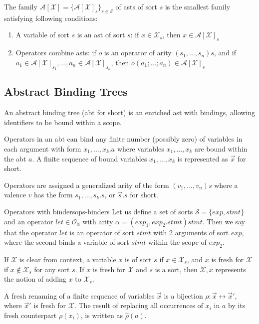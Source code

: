 The family $\mathcal{A}[\mathcal{X}] = \{ \mathcal{A}[\mathcal{X}]_s \}_{s \in \mathcal{S}}$ of asts of sort $s$ is the smallest family satisfying following conditions:

\begin{enumerate}
    \item A variable of sort $s$ is an ast of sort $s$: if $x \in \mathcal{X}_s$, then $x \in \mathcal{A}[ \mathcal{X}]_s$
    \item Operators combine asts: if $o$ is an operator of arity $(s_1,...,s_n)s$, and if $a_1 \in \mathcal{A}[\mathcal{X}]_{s_1},...,a_n \in \mathcal{A}[\mathcal{X}]_{s_n}$, then $o(a_1;...;a_n) \in \mathcal{A}[\mathcal{X}]_s$
\end{enumerate}

\subsection{Abstract Binding Trees}
An abstract binding tree (abt for short) is an enriched ast with bindings, allowing identifiers to be bound within a scope.

Operators in an abt can bind any finite number (possibly zero) of variables in each argument with form $x_1,...,x_k.a$ where variables $x_1,...,x_k$ are bound within the abt $a$. A finite sequence of bound variables $x_1,...,x_k$ is represented as $\vec{x}$ for short.

Operators are assigned a generalized arity of the form $(v_1,...,v_n)s$ where a valence $v$ has the form $s_1,...,s_k.s$, or $\Vec{s}.s$ for short.

\begin{example}{Operators with binders}{ops-binders}
    Let us define a set of sorts $\mathcal{S} = \{ exp, stmt \}$ and an operator $let \in \mathcal{O}_\alpha$ with arity $\alpha = (exp_1,exp_2.stmt)stmt$. Then we say that the operator $let$ is an operator of sort $stmt$ with 2 arguments of sort $exp$, where the second binds a variable of sort $stmt$ within the scope of $exp_2$.
\end{example}

If $\mathcal{X}$ is clear from context, a variable $x$ is of sort $s$ if $x \in \mathcal{X}_s$, and $x$ is fresh for $\mathcal{X}$ if $x \notin \mathcal{X}_s$ for any sort $s$. If $x$ is fresh for $\mathcal{X}$ and $s$ is a sort, then $\mathcal{X},x$ represents the notion of adding $x$ to $\mathcal{X}_s$.

A fresh renaming of a finite sequence of variables $\vec{x}$ is a bijection $\rho: \vec{x} \leftrightarrow \vec{x}'$, where $\vec{x}'$ is fresh for $\mathcal{X}$. The result of replacing all occurrences of $x_i$ in $a$ by its fresh counterpart $\rho(x_i)$, is written as $\hat{\rho}(a)$.


